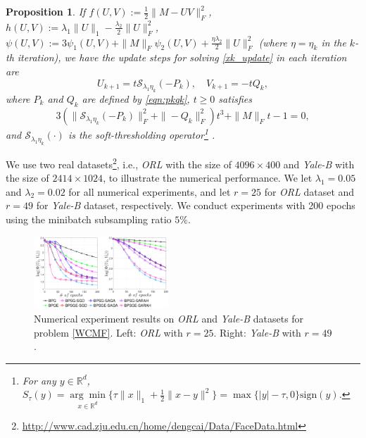 \documentclass[letterpaper]{article} %
\newtheorem{proposition}{Proposition}
\begin{document}
	\begin{proposition}\label{prop_WCMF}
		If $f(U,V):=\frac{1}{2}\|M-UV\|_{F}^{2}$, $h(U,V):=\lambda_{1}\|U\|_{1}-\frac{\lambda_{2}}{2}\|U\|_{F}^{2}$, $\psi(U,V):=3\psi_{1}(U,V)+\|M\|_{F}\psi_{2}(U,V)+\frac{\eta\lambda_{2}}{2}\|U\|_{F}^{2}$ (where $\eta=\eta_{k}$ in the $k$-th iteration), we have  the update steps  for solving \eqref{xk_update}  in each iteration  are
		\[
		U_{k+1}=t\mathcal{S}_{\lambda_{1}\eta_{k}}(-P_{k}),\quad V_{k+1}=-tQ_{k},
		\]
		where $P_k$ and $Q_k$ are defined by \eqref{eqn:pkqk}, $t\ge0$ satisfies
		\[
		3(\|\mathcal{S}_{\lambda_{1}\eta_{k}}(-P_{k})\|_{F}^{2}+\|-Q_{k}\|_{F}^{2}) t^{3}+\|M\|_{F}t-1=0,
		\]
		and $\mathcal{S}_{\lambda_{1}\eta_{k}}(\cdot)$ is the soft-thresholding operator\footnote{For any $y\in\mathbb{R}^{d}$, $S_{\tau}(y) =\underset{x\in\mathbb{R}^{d}}{\arg\min}\{\tau\|x\|_{1}+\frac{1}{2}\|x-y\|^{2}\}=\max\{|y|-\tau,0\}\text{sign}(y)$.} \cite{Donoho95}.
	\end{proposition}



	We use two real datasets\footnote{\url{http://www.cad.zju.edu.cn/home/dengcai/Data/FaceData.html}}, i.e., \emph{ORL} with the size of $4096 \times 400$ and \emph{Yale-B} with the size of $2414 \times 1024$, to illustrate the numerical performance.   We let $\lambda_{1}=0.05$ and $\lambda_{2}=0.02$ for all numerical experiments, and let $r=25$ for \emph{ORL} dataset and $r=49$ for \emph{Yale-B} dataset, respectively.
	We conduct experiments with 200 epochs using the minibatch subsampling ratio  $5\%$.
	\begin{figure}[!t]
		\centering
		\includegraphics[width=0.45\textwidth]{figs/WCMF_LOSS}
		\caption{Numerical experiment results on \emph{ORL} and \emph{Yale-B} datasets for   problem \eqref{WCMF}. Left: \emph{ORL} with $r=25$. Right: \emph{Yale-B} with $r=49$.
		}
		\label{WCMF_epochs}
	\end{figure}
\end{document}
